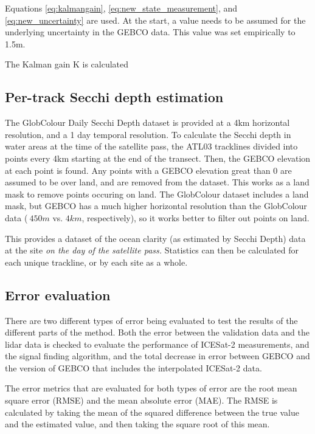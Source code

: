 Equations \ref{eq:kalmangain}, \ref{eq:new_state_measurement}, and \ref{eq:new_uncertainty} are used. At the start, a value needs to be assumed for the underlying uncertainty in the GEBCO data. This value was set empirically to 1.5m. 

The Kalman gain K is calculated

\subsection{Per-track Secchi depth estimation}

The GlobColour Daily Secchi Depth dataset is provided at a 4km horizontal resolution, and a 1 day temporal resolution. To calculate the Secchi depth in water areas at the time of the satellite pass, the ATL03 tracklines divided into points every 4km starting at the end of the transect. Then, the GEBCO elevation at each point is found. Any points with a GEBCO elevation great than 0 are assumed to be over land, and are removed from the dataset. This works as a land mask to remove points occuring on land. The GlobColour dataset includes a land mask, but GEBCO has a much higher horizontal resolution than the GlobColour data ($~450m$ vs. $4km$, respectively), so it works better to filter out points on land.  

This provides a dataset of the ocean clarity (as estimated by Secchi Depth) data at the site \emph{on the day of the satellite pass.} Statistics can then be calculated for each unique trackline, or by each site as a whole.


\subsection{Error evaluation}

There are two different types of error being evaluated to test the results of the different parts of the method. Both the error between the validation data and the lidar data is checked to evaluate the performance of ICESat-2 measurements, and the signal finding algorithm, and the total decrease in error between GEBCO and the version of GEBCO that includes the interpolated ICESat-2 data. 

The error metrics that are evaluated for both types of error are the root mean square error (RMSE) and the mean absolute error (MAE). The RMSE is calculated by taking the mean of the squared difference between the true value and the estimated value, and then taking the square root of this mean.

